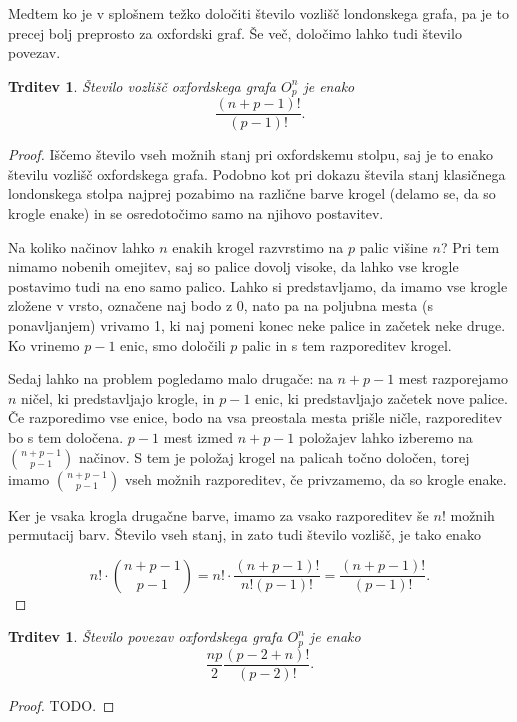 \documentclass[12pt,a4paper]{amsart}
\theoremstyle{definition} %
\theoremstyle{plain} %
\newtheorem{trditev}[definicija]{Trditev}
\begin{document}
Medtem ko je v splošnem težko določiti število vozlišč londonskega grafa, pa je to precej bolj preprosto za oxfordski graf. Še več, določimo lahko tudi število povezav.

\begin{trditev}
    Število vozlišč oxfordskega grafa $O^n_p$ je enako \[\frac{(n+p-1)!}{(p-1)!}.\]
\end{trditev}

\begin{proof}
    Iščemo število vseh možnih stanj pri oxfordskemu stolpu, saj je to enako številu vozlišč oxfordskega grafa.
    Podobno kot pri dokazu števila stanj klasičnega londonskega stolpa najprej pozabimo na različne barve krogel (delamo se, da so krogle enake) in se osredotočimo samo na njihovo postavitev. 
    
    Na koliko načinov lahko $n$ enakih krogel razvrstimo na $p$ palic višine $n$? Pri tem nimamo nobenih omejitev, saj so palice dovolj visoke, da lahko vse krogle postavimo tudi na eno samo palico. Lahko si predstavljamo, da imamo vse krogle zložene v vrsto, označene naj bodo z 0, nato pa na poljubna mesta (s ponavljanjem) vrivamo 1, ki naj pomeni konec neke palice in začetek neke druge. Ko vrinemo $p-1$ enic, smo določili $p$ palic in s tem razporeditev krogel. 
    
    Sedaj lahko na problem pogledamo malo drugače: na $n+p-1$ mest razporejamo $n$ ničel, ki predstavljajo krogle, in $p-1$ enic, ki predstavljajo začetek nove palice. Če razporedimo vse enice, bodo na vsa preostala mesta prišle ničle, razporeditev bo s tem določena. $p-1$ mest izmed $n+p-1$ položajev lahko izberemo na ${n+p-1 \choose p-1}$ načinov. S tem je položaj krogel na palicah točno določen, torej imamo ${n+p-1 \choose p-1}$ vseh možnih razporeditev, če privzamemo, da so krogle enake. 
    
    Ker je vsaka krogla drugačne barve, imamo za vsako razporeditev še $n!$ možnih permutacij barv. Število vseh stanj, in zato tudi število vozlišč, je tako enako
    
    \[ n! \cdot {n+p-1 \choose p-1} = n! \cdot \frac{(n+p-1)!}{n!(p-1)!} = \frac{(n+p-1)!}{(p-1)!}. \] \qedhere
\end{proof}

\begin{trditev}
    Število povezav oxfordskega grafa $O^n_p$ je enako
    \[ \frac{np}{2} \frac{(p-2+n)!}{(p-2)!} .\]
\end{trditev}

\begin{proof}
    TODO.
\end{proof}
\end{document}
